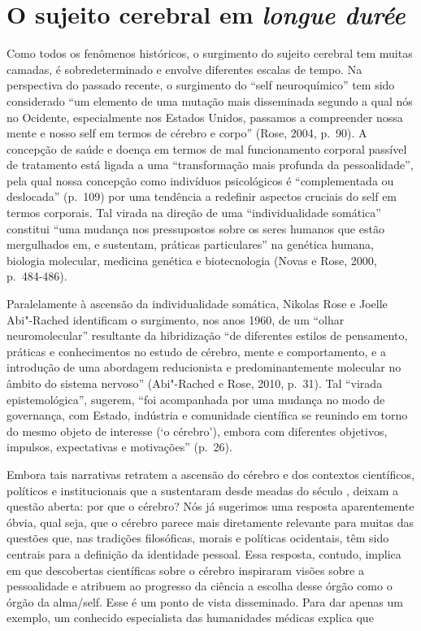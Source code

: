 \chapter{O sujeito cerebral em \emph{longue durée}}

Como todos os fenômenos históricos, o surgimento do sujeito cerebral tem
muitas camadas, é sobredeterminado e envolve diferentes escalas de
tempo. Na perspectiva do passado recente, o surgimento do ``self
neuroquímico'' tem sido considerado ``um elemento de uma mutação mais
disseminada segundo a qual nós no Ocidente, especialmente nos Estados
Unidos, passamos a compreender nossa mente e nosso self em termos de
cérebro e corpo'' (Rose, 2004, p.~90). A concepção de saúde e doença em
termos de mal funcionamento corporal passível de tratamento está ligada
a uma ``transformação mais profunda da pessoalidade'', pela qual nossa
concepção como indivíduos psicológicos é ``complementada ou deslocada''
(p.~109) por uma tendência a redefinir aspectos cruciais do self em
termos corporais. Tal virada na direção de uma ``individualidade
somática'' constitui ``uma mudança nos pressupostos sobre os seres
humanos que estão mergulhados em, e sustentam, práticas particulares''
na genética humana, biologia molecular, medicina genética e
biotecnologia (Novas e Rose, 2000, p.~484-486).

Paralelamente à ascensão da individualidade somática, Nikolas Rose e
Joelle Abi"-Rached identificam o surgimento, nos anos 1960, de um ``olhar
neuromolecular'' resultante da hibridização ``de diferentes estilos de
pensamento, práticas e conhecimentos no estudo de cérebro, mente e
comportamento, e a introdução de uma abordagem reducionista e
predominantemente molecular no âmbito do sistema nervoso'' (Abi"-Rached e
Rose, 2010, p.~31). Tal ``virada epistemológica'', sugerem, ``foi
acompanhada por uma mudança no modo de governança, com Estado, indústria
e comunidade científica se reunindo em torno do mesmo objeto de
interesse (`o cérebro'), embora com diferentes objetivos, impulsos,
expectativas e motivações'' (p.~26).

Embora tais narrativas retratem a ascensão do cérebro e dos contextos
científicos, políticos e institucionais que a sustentaram desde meadas
do século , deixam a questão aberta: por que o cérebro? Nós já
sugerimos uma resposta aparentemente óbvia, qual seja, que o cérebro
parece mais diretamente relevante para muitas das questões que, nas
tradições filosóficas, morais e políticas ocidentais, têm sido centrais
para a definição da identidade pessoal. Essa resposta, contudo, implica
em que descobertas científicas sobre o cérebro inspiraram visões sobre a
pessoalidade e atribuem ao progresso da ciência a escolha desse órgão
como o órgão da alma/self. Esse é um ponto de vista disseminado. Para
dar apenas um exemplo, um conhecido especialista das humanidades médicas
explica que

